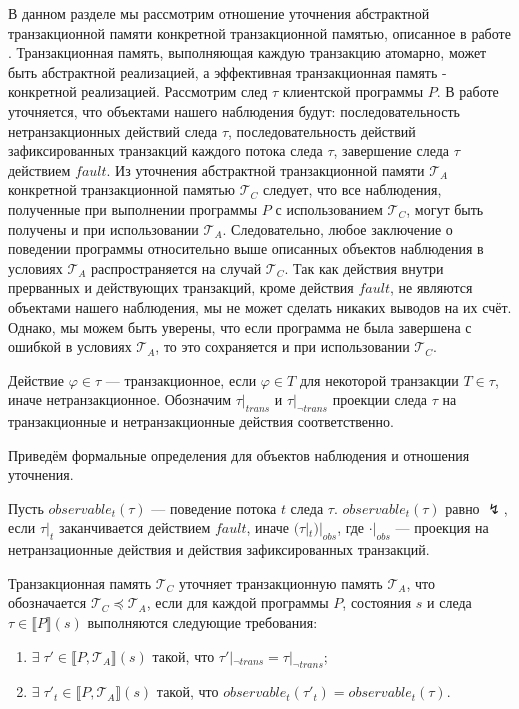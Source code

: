 В данном разделе мы рассмотрим отношение уточнения абстрактной транзакционной памяти конкретной транзакционной памятью, описанное в работе \cite{tms_article}. Транзакционная память, выполняющая каждую транзакцию атомарно, может быть абстрактной реализацией, а эффективная транзакционная память - конкретной реализацией. Рассмотрим след $\tau$ клиентской программы $P$. В работе \cite{tms_article} уточняется, что объектами нашего наблюдения будут: последовательность нетранзакционных действий следа $\tau$, последовательность действий зафиксированных транзакций каждого потока следа $\tau$, завершение следа $\tau$ действием $fault$. Из уточнения абстрактной транзакционной памяти $\mathcal{T}_A$ конкретной транзакционной памятью $\mathcal{T}_C$ следует, что все наблюдения, полученные при выполнении программы $P$ с использованием $\mathcal{T}_C$, могут быть получены и при использовании $\mathcal{T}_A$. Следовательно, любое заключение о поведении программы относительно выше описанных объектов наблюдения в условиях $\mathcal{T}_A$ распространяется на случай $\mathcal{T}_C$. Так как действия внутри прерванных и действующих транзакций, кроме действия $fault$, не являются объектами нашего наблюдения, мы не может сделать никаких выводов на их счёт. Однако, мы можем быть уверены, что если программа не была завершена с ошибкой в условиях $\mathcal{T}_A$, то это сохраняется и при использовании $\mathcal{T}_C$.

Действие $\varphi \in \tau$ --- транзакционное, если $\varphi \in T$ для некоторой транзакции $T \in \tau$, иначе нетранзакционное. Обозначим $\tau|_{trans}$ и $\tau|_{\neg trans}$ проекции следа $\tau$ на транзакционные и нетранзакционные действия соответственно.

Приведём формальные определения для объектов наблюдения и отношения уточнения. 

\begin{mydefinition}
Пусть $observable_t(\tau)$ --- поведение потока $t$ следа $\tau$. $observable_t(\tau)$ равно $\lightning$, если $\tau|_t$ заканчивается действием $fault$, иначе $(\tau|_t)|_{obs}$, где $\cdot|_{obs}$ --- проекция на нетранзационные действия и действия зафиксированных транзакций.
\end{mydefinition}

\begin{mydefinition}
Транзакционная память $\mathcal{T}_C$ уточняет транзакционную память $\mathcal{T}_A$, что обозначается $\mathcal{T}_C \preceq \mathcal{T}_A$, если для каждой программы $P$, состояния $s$ и следа $\tau \in \llbracket P \rrbracket(s)$ выполняются следующие требования: \begin{enumerate}[label=(\roman*)]
\item $\exists \; \tau' \in \llbracket P, \mathcal{T}_A \rrbracket(s)$ такой, что $\tau'|_{\neg trans} = \tau|_{\neg trans}$;
\item $\exists \; \tau'_t \in \llbracket P, \mathcal{T}_A \rrbracket(s)$ такой, что $observable_t(\tau'_t) = observable_t(\tau)$.
\end{enumerate} 
\end{mydefinition}


